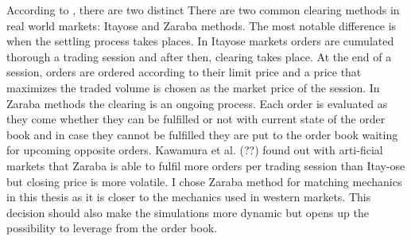 According to , there are two distinct 
There are two common clearing methods in real world markets: 
Itayose and Zaraba methods. The most notable difference is 
when the settling process takes places. In Itayose markets 
orders are cumulated thorough a trading session and after 
then, clearing takes place. At the end of a session, orders 
are ordered according to their limit price and a price that 
maximizes the traded volume is chosen as the market price of 
the session. In Zaraba methods the clearing is an ongoing process. 
Each order is evaluated as they come whether they can be fulfilled 
or not with current state of the order book and in case they 
cannot be fulfilled they are put to the order book waiting 
for upcoming opposite orders. Kawamura et al. (??) found 
out with arti-ficial markets that Zaraba is able to fulfil 
more orders per trading session than Itay-ose but closing 
price is more volatile. I chose Zaraba method for matching 
mechanics in this thesis as it is closer to the mechanics 
used in western markets. This decision should also make 
the simulations more dynamic but opens up the possibility 
to leverage from the order book.